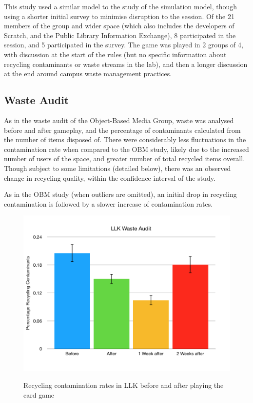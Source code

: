 \documentclass[nofonts,nols,justified,nobib]{tufte-book}
\begin{document}
This study used a similar model to the study of the simulation model, though using a shorter initial survey to minimise disruption to the session. Of the 21 members of the group and wider space (which also includes the developers of Scratch, and the Public Library Information Exchange), 8 participated in the session, and 5 participated in the survey. The game was played in 2 groups of 4, with discussion at the start of the rules (but no specific information about recycling contaminants or waste streams in the lab), and then a longer discussion at the end around campus waste management practices.

\subsection*{Waste Audit}
As in the waste audit of the Object-Based Media Group, waste was analysed before and after gameplay, and the percentage of contaminants calculated from the number of items disposed of. There were considerably less fluctuations in the contamination rate when compared to the OBM study, likely due to the increased number of users of the space, and greater number of total recycled items overall. Though subject to some limitations (detailed below), there was an observed change in recycling quality, within the confidence interval of the study.

As in the OBM study (when outliers are omitted), an initial drop in recycling contamination is followed by a slower increase of contamination rates.

\begin{figure}
  \caption{Recycling contamination rates in LLK before and after playing the card game}
  \includegraphics[width=1\linewidth]{img/4/finalresults/llk-wasteaudit.png}
  \label{contamination}
\end{figure}
\end{document}
